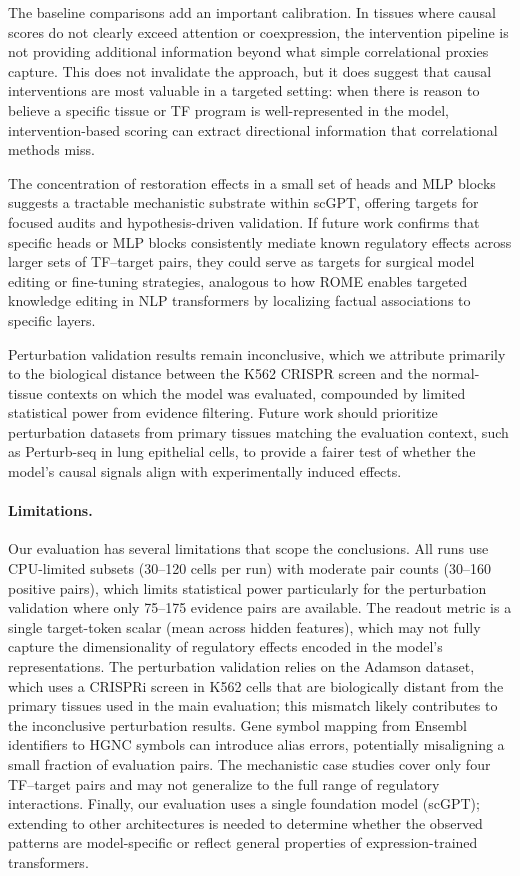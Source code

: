 \documentclass[10pt,letterpaper]{article}
\begin{document}
The baseline comparisons add an important calibration. In tissues where causal
scores do not clearly exceed attention or coexpression, the intervention
pipeline is not providing additional information beyond what simple
correlational proxies capture. This does not invalidate the approach, but it
does suggest that causal interventions are most valuable in a targeted
setting: when there is reason to believe a specific tissue or TF program is
well-represented in the model, intervention-based scoring can extract
directional information that correlational methods miss.

The concentration of restoration effects in a small set of heads and MLP
blocks suggests a tractable mechanistic substrate within scGPT, offering
targets for focused audits and hypothesis-driven validation. If future work
confirms that specific heads or MLP blocks consistently mediate known
regulatory effects across larger sets of TF--target pairs, they could serve
as targets for surgical model editing or fine-tuning strategies, analogous to
how ROME \cite{meng_rome_2022} enables targeted knowledge editing in NLP
transformers by localizing factual associations to specific layers.

Perturbation validation results remain inconclusive, which we attribute
primarily to the biological distance between the K562 CRISPR screen and the
normal-tissue contexts on which the model was evaluated, compounded by limited
statistical power from evidence filtering. Future work should prioritize
perturbation datasets from primary tissues matching the evaluation context,
such as Perturb-seq in lung epithelial cells, to provide a fairer test of
whether the model's causal signals align with experimentally induced effects.

\paragraph{Limitations.}
Our evaluation has several limitations that scope the conclusions. All runs
use CPU-limited subsets (30--120 cells per run) with moderate pair counts
(30--160 positive pairs), which limits statistical power particularly for the
perturbation validation where only 75--175 evidence pairs are available. The
readout metric is a single target-token scalar (mean across hidden features),
which may not fully capture the dimensionality of regulatory effects encoded
in the model's representations. The perturbation validation relies on the
Adamson dataset, which uses a CRISPRi screen in K562 cells that are
biologically distant from the primary tissues used in the main evaluation;
this mismatch likely contributes to the inconclusive perturbation results.
Gene symbol mapping from Ensembl identifiers to HGNC symbols can introduce
alias errors, potentially misaligning a small fraction of evaluation pairs.
The mechanistic case studies cover only four TF--target pairs and may not
generalize to the full range of regulatory interactions. Finally, our
evaluation uses a single foundation model (scGPT); extending to other
architectures is needed to determine whether the observed patterns are
model-specific or reflect general properties of expression-trained
transformers.
\end{document}
